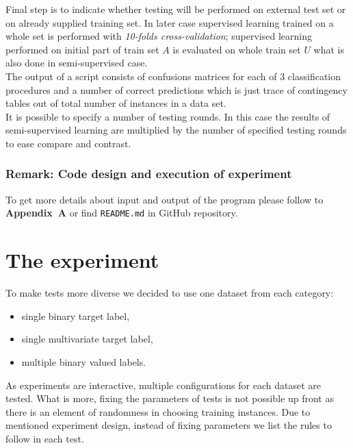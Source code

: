 \documentclass[12pt, a4paper, pdflatex]{report}
\begin{document}
Final step is to indicate whether testing will be performed on external test set or on already supplied training set. In later case supervised learning trained on a whole set is performed with \emph{10-folds cross-validation}; supervised learning performed on initial part of train set $A$ is evaluated on whole train set $U$ what is also done in semi-supervised case.\\

The output of a script consists of confusions matrices for each of 3 classification procedures and a number of correct predictions which is just trace of contingency tables out of total number of instances in a data set.\\
It is possible to specify a number of testing rounds. In this case the results of semi-supervised learning are multiplied by the number of specified testing rounds to ease compare and contrast.

\subsubsection{Remark: Code design and execution of experiment}
To get more details about input and output of the program please follow to \textbf{Appendix~A} or find \texttt{README.md} in GitHub repository\cite{githubcode}.

\section{The experiment}
To make tests more diverse we decided to use one dataset from each category:
\begin{itemize}
\item single binary target label,
\item single multivariate target label,%
\item multiple binary valued labels.
\end{itemize}
As experiments are interactive, multiple configurations for each dataset are tested. What is more, fixing the parameters of tests is not possible up front as there is an element of randomness in choosing training instances. Due to mentioned experiment design, instead of fixing parameters we list the rules to follow in each test.
\end{document}
